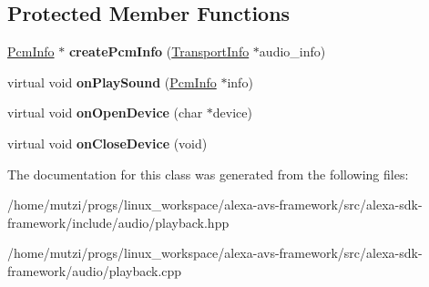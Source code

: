 \subsection*{Protected Member Functions}
\begin{DoxyCompactItemize}
\item 
\mbox{\label{classAVS_1_1Playback_a896b0fa90652053bcfa9d73f349f014e}} 
\hyperlink{classAVS_1_1PcmInfo}{Pcm\+Info} $\ast$ {\bfseries create\+Pcm\+Info} (\hyperlink{classAlexaEvent_1_1TransportInfo}{Transport\+Info} $\ast$audio\+\_\+info)
\item 
\mbox{\label{classAVS_1_1Playback_ab1c10a0841372659a8c5f7b7872689f9}} 
virtual void {\bfseries on\+Play\+Sound} (\hyperlink{classAVS_1_1PcmInfo}{Pcm\+Info} $\ast$info)
\item 
\mbox{\label{classAVS_1_1Playback_aede719f86ea436066d4c6eb21b412ea6}} 
virtual void {\bfseries on\+Open\+Device} (char $\ast$device)
\item 
\mbox{\label{classAVS_1_1Playback_a78f2de98690ca3f02cb3fc9a27e73a8a}} 
virtual void {\bfseries on\+Close\+Device} (void)
\end{DoxyCompactItemize}


The documentation for this class was generated from the following files\+:\begin{DoxyCompactItemize}
\item 
/home/mutzi/progs/linux\+\_\+workspace/alexa-\/avs-\/framework/src/alexa-\/sdk-\/framework/include/audio/playback.\+hpp\item 
/home/mutzi/progs/linux\+\_\+workspace/alexa-\/avs-\/framework/src/alexa-\/sdk-\/framework/audio/playback.\+cpp\end{DoxyCompactItemize}
